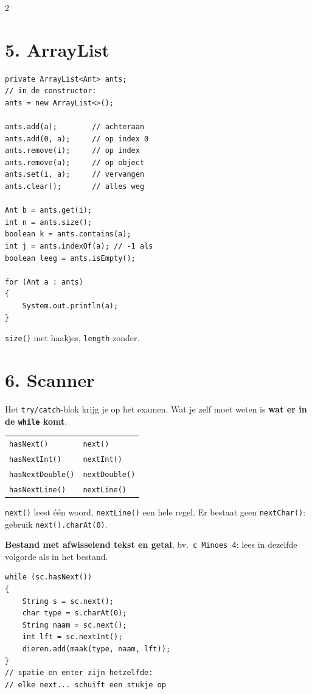 \documentclass[12pt,a4paper]{extarticle}
\begin{document}
\begin{multicols}{2}
    \section{5. ArrayList}
    \begin{lstlisting}
private ArrayList<Ant> ants;
// in de constructor:
ants = new ArrayList<>();

ants.add(a);        // achteraan
ants.add(0, a);     // op index 0
ants.remove(i);     // op index
ants.remove(a);     // op object
ants.set(i, a);     // vervangen
ants.clear();       // alles weg

Ant b = ants.get(i);
int n = ants.size();
boolean k = ants.contains(a);
int j = ants.indexOf(a); // -1 als
boolean leeg = ants.isEmpty();

for (Ant a : ants)
{
    System.out.println(a);
}
\end{lstlisting}
    \texttt{size()} met haakjes, \texttt{length} zonder.

    \section{6. Scanner}
    Het \texttt{try/catch}-blok krijg je op het examen. Wat je zelf moet weten is
    \textbf{wat er in de \texttt{while} komt}.

    \begin{center}
        \small
        \begin{tabular}{@{}ll@{}}
            \toprule
            \texttt{hasNext()}       & \texttt{next()}       \\
            \texttt{hasNextInt()}    & \texttt{nextInt()}    \\
            \texttt{hasNextDouble()} & \texttt{nextDouble()} \\
            \texttt{hasNextLine()}   & \texttt{nextLine()}   \\
            \bottomrule
        \end{tabular}
    \end{center}
    \texttt{next()} leest \'e\'en woord, \texttt{nextLine()} een hele regel. Er
    bestaat geen \texttt{nextChar()}: gebruik \texttt{next().charAt(0)}.

    \textbf{Bestand met afwisselend tekst en getal}, bv.\ \texttt{c Minoes 4}: lees
    in dezelfde volgorde als in het bestand.
    \begin{lstlisting}
while (sc.hasNext())
{
    String s = sc.next();
    char type = s.charAt(0);
    String naam = sc.next();
    int lft = sc.nextInt();
    dieren.add(maak(type, naam, lft));
}
// spatie en enter zijn hetzelfde:
// elke next... schuift een stukje op
\end{lstlisting}


\end{multicols}
\end{document}
